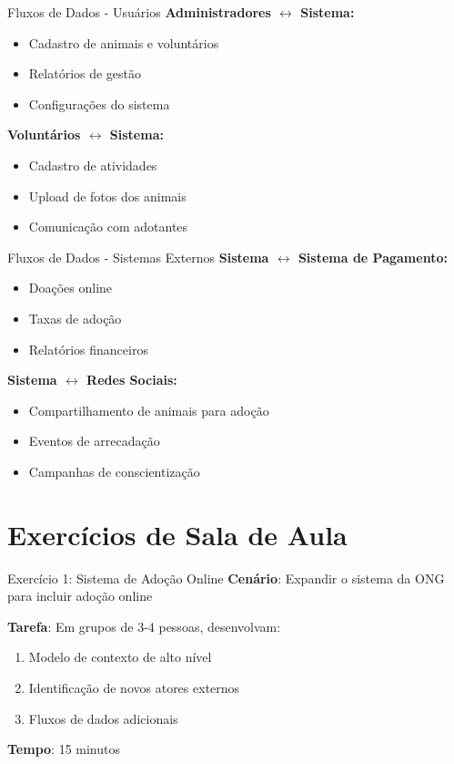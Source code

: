 \documentclass[aspectratio=169]{beamer}
\begin{document}
\begin{frame}{Fluxos de Dados - Usuários}
\textbf{Administradores $\leftrightarrow$ Sistema:}
\begin{itemize}
\item Cadastro de animais e voluntários
\item Relatórios de gestão
\item Configurações do sistema
\end{itemize}

\vspace{0.3cm}
\textbf{Voluntários $\leftrightarrow$ Sistema:}
\begin{itemize}
\item Cadastro de atividades
\item Upload de fotos dos animais
\item Comunicação com adotantes
\end{itemize}
\end{frame}

\begin{frame}{Fluxos de Dados - Sistemas Externos}
\textbf{Sistema $\leftrightarrow$ Sistema de Pagamento:}
\begin{itemize}
\item Doações online
\item Taxas de adoção
\item Relatórios financeiros
\end{itemize}

\vspace{0.3cm}
\textbf{Sistema $\leftrightarrow$ Redes Sociais:}
\begin{itemize}
\item Compartilhamento de animais para adoção
\item Eventos de arrecadação
\item Campanhas de conscientização
\end{itemize}
\end{frame}

\section{Exercícios de Sala de Aula}

\begin{frame}{Exercício 1: Sistema de Adoção Online}
\textbf{Cenário}: Expandir o sistema da ONG para incluir adoção online

\textbf{Tarefa}: Em grupos de 3-4 pessoas, desenvolvam:
\begin{enumerate}
\item Modelo de contexto de alto nível
\item Identificação de novos atores externos
\item Fluxos de dados adicionais
\end{enumerate}

\vspace{0.5cm}
\textbf{Tempo}: 15 minutos
\end{frame}
\end{document}
